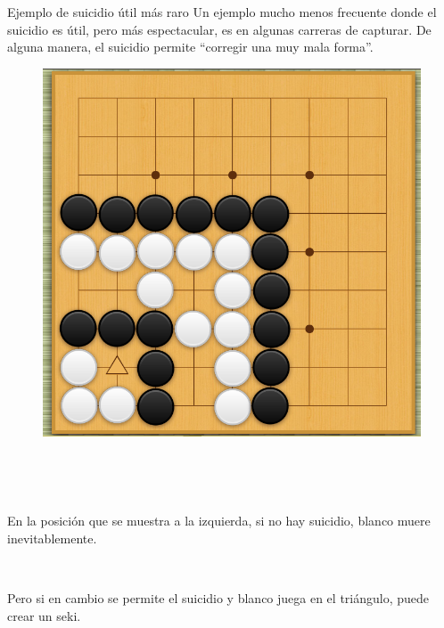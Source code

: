 \documentclass{beamer}
\begin{document}
\begin{frame}{Ejemplo de suicidio útil más raro}
\vspace{-1.5cm}
    Un ejemplo mucho menos frecuente donde el suicidio es útil, pero más espectacular, es en algunas carreras de capturar. De alguna manera, el suicidio permite ``corregir una muy mala forma''.
    
 \begin{figure}
    \includegraphics[scale=0.25]{suicidio-carrera.png} 
\end{figure}

\vspace{-0.4cm}

\ 

\ 

En la posición que se muestra a la izquierda, si no hay suicidio, blanco muere inevitablemente. 

\ 

Pero si en cambio se permite el suicidio y blanco juega en el triángulo, puede crear un seki.

\end{frame}
\end{document}
